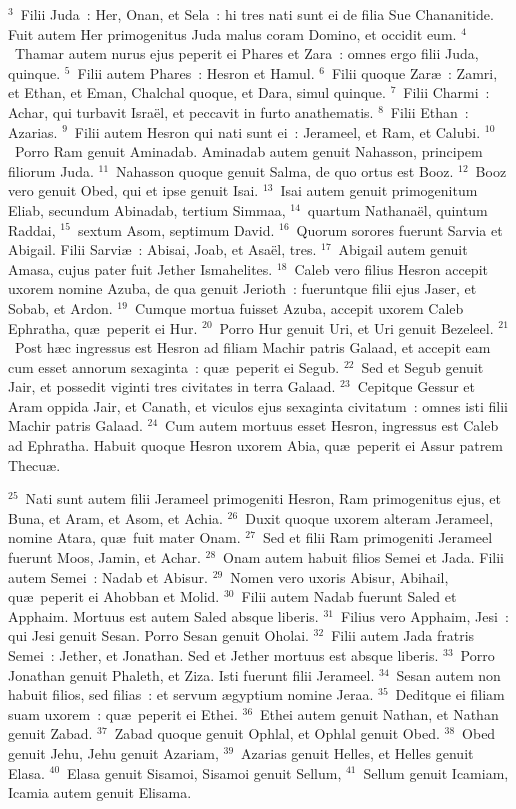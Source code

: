 ${}^{3}$~Filii Juda~: Her, Onan, et Sela~: hi tres nati sunt ei de filia Sue Chananitide. Fuit autem Her primogenitus Juda malus coram Domino, et occidit eum.
${}^{4}$~Thamar autem nurus ejus peperit ei Phares et Zara~: omnes ergo filii Juda, quinque.
${}^{5}$~Filii autem Phares~: Hesron et Hamul.
${}^{6}$~Filii quoque Zar\ae~: Zamri, et Ethan, et Eman, Chalchal quoque, et Dara, simul quinque.
${}^{7}$~Filii Charmi~: Achar, qui turbavit Isra\"el, et peccavit in furto anathematis.
${}^{8}$~Filii Ethan~: Azarias.
${}^{9}$~Filii autem Hesron qui nati sunt ei~: Jerameel, et Ram, et Calubi.
${}^{10}$~Porro Ram genuit Aminadab. Aminadab autem genuit Nahasson, principem filiorum Juda.
${}^{11}$~Nahasson quoque genuit Salma, de quo ortus est Booz.
${}^{12}$~Booz vero genuit Obed, qui et ipse genuit Isai.
${}^{13}$~Isai autem genuit primogenitum Eliab, secundum Abinadab, tertium Simmaa,
${}^{14}$~quartum Nathana\"el, quintum Raddai,
${}^{15}$~sextum Asom, septimum David.
${}^{16}$~Quorum sorores fuerunt Sarvia et Abigail. Filii Sarvi\ae~: Abisai, Joab, et Asa\"el, tres.
${}^{17}$~Abigail autem genuit Amasa, cujus pater fuit Jether Ismahelites.
${}^{18}$~Caleb vero filius Hesron accepit uxorem nomine Azuba, de qua genuit Jerioth~: fueruntque filii ejus Jaser, et Sobab, et Ardon.
${}^{19}$~Cumque mortua fuisset Azuba, accepit uxorem Caleb Ephratha, qu\ae\ peperit ei Hur.
${}^{20}$~Porro Hur genuit Uri, et Uri genuit Bezeleel.
${}^{21}$~Post h\ae c ingressus est Hesron ad filiam Machir patris Galaad, et accepit eam cum esset annorum sexaginta~: qu\ae\ peperit ei Segub.
${}^{22}$~Sed et Segub genuit Jair, et possedit viginti tres civitates in terra Galaad.
${}^{23}$~Cepitque Gessur et Aram oppida Jair, et Canath, et viculos ejus sexaginta civitatum~: omnes isti filii Machir patris Galaad.
${}^{24}$~Cum autem mortuus esset Hesron, ingressus est Caleb ad Ephratha. Habuit quoque Hesron uxorem Abia, qu\ae\ peperit ei Assur patrem Thecu\ae .


${}^{25}$~Nati sunt autem filii Jerameel primogeniti Hesron, Ram primogenitus ejus, et Buna, et Aram, et Asom, et Achia.
${}^{26}$~Duxit quoque uxorem alteram Jerameel, nomine Atara, qu\ae\ fuit mater Onam.
${}^{27}$~Sed et filii Ram primogeniti Jerameel fuerunt Moos, Jamin, et Achar.
${}^{28}$~Onam autem habuit filios Semei et Jada. Filii autem Semei~: Nadab et Abisur.
${}^{29}$~Nomen vero uxoris Abisur, Abihail, qu\ae\ peperit ei Ahobban et Molid.
${}^{30}$~Filii autem Nadab fuerunt Saled et Apphaim. Mortuus est autem Saled absque liberis.
${}^{31}$~Filius vero Apphaim, Jesi~: qui Jesi genuit Sesan. Porro Sesan genuit Oholai.
${}^{32}$~Filii autem Jada fratris Semei~: Jether, et Jonathan. Sed et Jether mortuus est absque liberis.
${}^{33}$~Porro Jonathan genuit Phaleth, et Ziza. Isti fuerunt filii Jerameel.
${}^{34}$~Sesan autem non habuit filios, sed filias~: et servum \ae gyptium nomine Jeraa.
${}^{35}$~Deditque ei filiam suam uxorem~: qu\ae\ peperit ei Ethei.
${}^{36}$~Ethei autem genuit Nathan, et Nathan genuit Zabad.
${}^{37}$~Zabad quoque genuit Ophlal, et Ophlal genuit Obed.
${}^{38}$~Obed genuit Jehu, Jehu genuit Azariam,
${}^{39}$~Azarias genuit Helles, et Helles genuit Elasa.
${}^{40}$~Elasa genuit Sisamoi, Sisamoi genuit Sellum,
${}^{41}$~Sellum genuit Icamiam, Icamia autem genuit Elisama.


